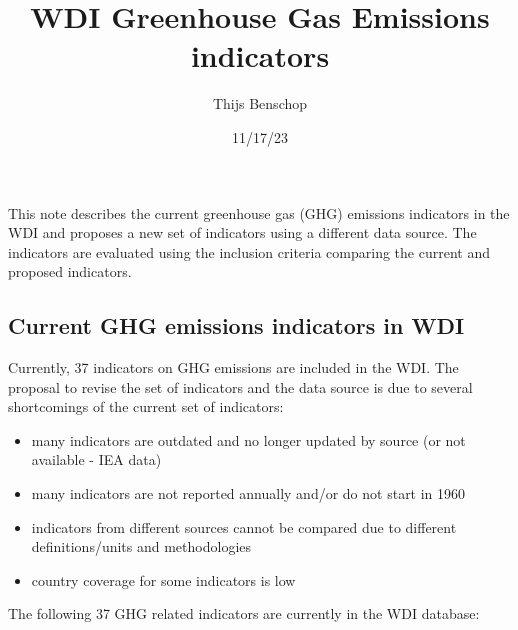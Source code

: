 \documentclass[
  letterpaper,
  DIV=11,
  numbers=noendperiod]{scrartcl}
\title{WDI Greenhouse Gas Emissions indicators}
\author{Thijs Benschop}
\date{11/17/23}
\providecommand{\tightlist}{%
  \setlength{\itemsep}{0pt}\setlength{\parskip}{0pt}}\usepackage{longtable,booktabs,array}
\begin{document}
\maketitle
\ifdefined\Shaded\renewenvironment{Shaded}{\begin{tcolorbox}[borderline west={3pt}{0pt}{shadecolor}, sharp corners, enhanced, breakable, boxrule=0pt, interior hidden, frame hidden]}{\end{tcolorbox}}\fi

This note describes the current greenhouse gas (GHG) emissions
indicators in the WDI and proposes a new set of indicators using a
different data source. The indicators are evaluated using the inclusion
criteria comparing the current and proposed indicators.

\hypertarget{current-ghg-emissions-indicators-in-wdi}{%
\subsection{Current GHG emissions indicators in
WDI}\label{current-ghg-emissions-indicators-in-wdi}}

Currently, 37 indicators on GHG emissions are included in the WDI. The
proposal to revise the set of indicators and the data source is due to
several shortcomings of the current set of indicators:

\begin{itemize}
\tightlist
\item
  many indicators are outdated and no longer updated by source (or not
  available - IEA data)
\item
  many indicators are not reported annually and/or do not start in 1960
\item
  indicators from different sources cannot be compared due to different
  definitions/units and methodologies
\item
  country coverage for some indicators is low
\end{itemize}

The following 37 GHG related indicators are currently in the WDI
database:
\end{document}

